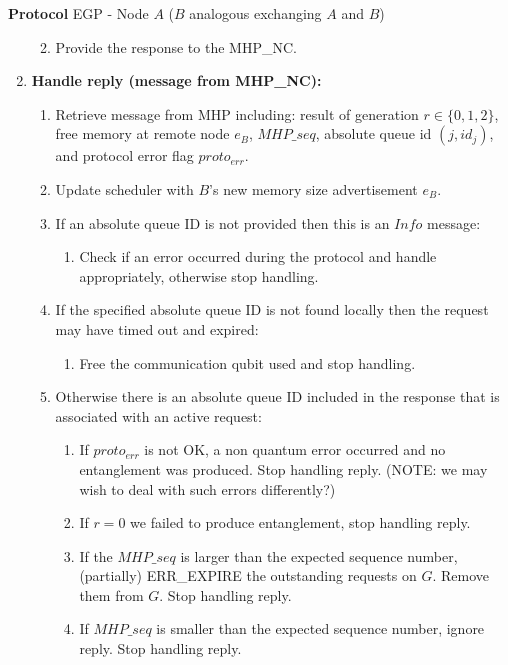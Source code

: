 \documentclass{article}
\makeatletter
\newcounter{Lprotocol}
\newenvironment{Lprotocol}[1]
  {\par\addvspace{\topsep}
   \noindent
   \tabularx{\linewidth}{@{} X @{}}
    \hline
    \refstepcounter{Lprotocol}\textbf{Protocol \theLprotocol} #1 \\
    \hline}
  { \\
    \hline
   \endtabularx
   \par\addvspace{\topsep}}
\makeatother
\begin{document}
\begin{Lprotocol}{EGP - Node $A$ ($B$ analogous exchanging $A$ and $B$)}
\begin{enumerate}
\begin{enumerate}
\begin{enumerate}
    \end{enumerate}
    \item Provide the response to the MHP\_NC.
   \end{enumerate}
   \item \textbf{Handle reply (message from MHP\_NC):}
   \begin{enumerate}
   \item Retrieve message from MHP including: result of generation $r \in \{0,1,2\}$, free memory at remote node $e_B$, $MHP\_seq$, absolute queue id $(j,id_j)$, and protocol error flag $proto_{err}$.
   \item Update scheduler with $B$'s new memory size advertisement $e_B$.
   \item If an absolute queue ID is not provided then this is an $Info$ message:
   \begin{enumerate}
     \item Check if an error occurred during the protocol and handle appropriately, otherwise stop handling.
   \end{enumerate}
   \item If the specified absolute queue ID is not found locally then the request may have timed out and expired:
   \begin{enumerate}
     \item Free the communication qubit used and stop handling.
   \end{enumerate}
   \item Otherwise there is an absolute queue ID included in the response that is associated with an active request:
   \begin{enumerate}
     \item If $proto_{err}$ is not OK, a non quantum error occurred and no entanglement was produced. Stop handling reply. (NOTE: we may wish to deal with such errors differently?)
     \item If $r = 0$ we failed to produce entanglement, stop handling reply.
     \item If the $MHP\_seq$ is larger than the expected sequence number, (partially) ERR\_EXPIRE the outstanding
	   requests on $G$. Remove them from $G$. Stop handling reply.
     \item If $MHP\_seq$ is smaller than the expected sequence number, ignore reply. Stop handling reply.
     \setcounter{enumTemp}{\value{enumiii}}
     \end{enumerate}
  \end{enumerate}
\end{enumerate}
\end{Lprotocol}
\end{document}
